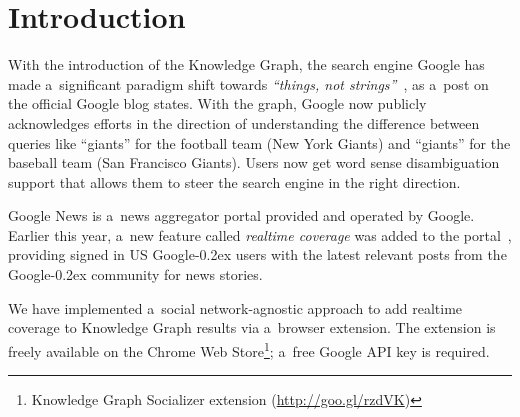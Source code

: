 \documentclass[runningheads,a4paper]{llncs}
\newcommand{\googleplus}{Google\nolinebreak\hspace{0em}\raisebox{.28ex}{\tiny\bf +}\kern-0.2ex\xspace}
\begin{document}

\section{Introduction}
With the introduction of the Knowledge Graph, the search engine Google
has made a~significant paradigm shift towards \textit{``things, not strings''}~\cite{singhal2012},
as a~post on the official Google blog states.
With the graph, Google now publicly acknowledges efforts in the direction of
understanding the difference between queries like ``giants''
for the football team (New York Giants)
and ``giants'' for the baseball team (San Francisco Giants).
Users now get word sense disambiguation support that allows them
to steer the search engine in the right direction.

Google News is a~news aggregator portal provided and operated by Google.
Earlier this year, a~new feature called \emph{realtime coverage}
was added to the portal~\cite{zuccarino2012}, providing signed in US \googleplus users
with the latest relevant posts from the \googleplus community for news stories.

We have implemented a~social network-agnostic approach
to add realtime coverage to Knowledge Graph results via a~browser extension.
The extension is freely available on the Chrome Web
Store\footnote{Knowledge Graph Socializer extension (\url{http://goo.gl/rzdVK})};
a~free Google API key is required.

\end{document}
